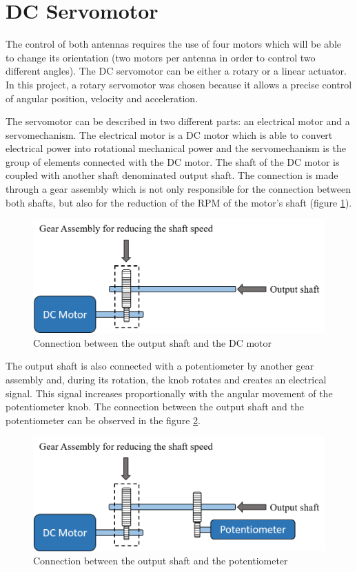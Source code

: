 \section{DC Servomotor}\label{sec:servo_motor}

The control of both antennas requires the use of four motors which will be able to change its orientation (two motors per antenna in order to control two different angles). The DC servomotor can be either a rotary or a linear actuator. In this project, a rotary servomotor was chosen because it allows a precise control of angular position, velocity and acceleration.

The servomotor can be described in two different parts: an electrical motor and a servomechanism. The electrical motor is a DC motor which is able to convert electrical power into rotational mechanical power and the servomechanism is the group of elements connected with the DC motor. The shaft of the DC motor is coupled with another shaft denominated output shaft. The connection is made through a gear assembly which is not only responsible for the connection between both shafts, but also for the reduction of the RPM of the motor’s shaft (figure \ref{servomotor_expl1}).

\begin{figure}[H]
\centering
\includegraphics[scale=0.7]{figures/servomotor_expl1.png}
\caption{Connection between the output shaft and the DC motor}
\label{servomotor_expl1}
\end{figure}

The output shaft is also connected with a potentiometer by another gear assembly and, during its rotation, the knob rotates and creates an electrical signal. This signal increases proportionally with the angular movement of the potentiometer knob. The connection between the output shaft and the potentiometer can be
observed in the figure \ref{servomotor_expl2}.

\begin{figure}[H]
\centering
\includegraphics[scale=0.61]{figures/servomotor_expl2.png}
\caption{Connection between the output shaft and the potentiometer}
\label{servomotor_expl2}
\end{figure}


